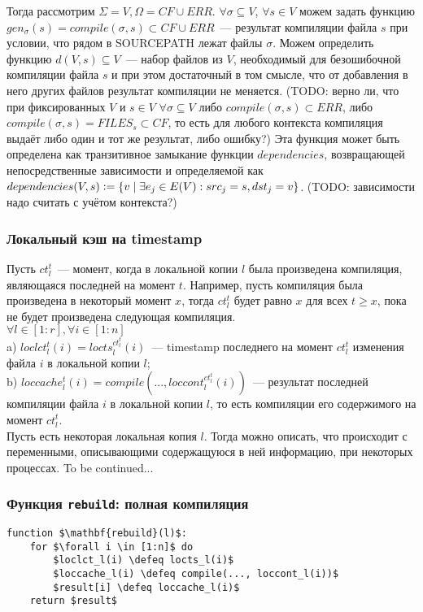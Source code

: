Тогда рассмотрим $\Sigma = V, \Omega = CF \cup ERR$. $\forall \sigma \subseteq V$, $\forall s \in V$ можем задать функцию $gen_\sigma(s) = \textit{compile}(\sigma, s) \subset CF \cup ERR$~--- результат компиляции файла $s$ при условии, что рядом в SOURCEPATH лежат файлы $\sigma$. Можем определить функцию $d(V,s) \subseteq V$~--- набор файлов из $V$, необходимый для безошибочной компиляции файла $s$ и при этом достаточный в том смысле, что от добавления в него других файлов результат компиляции не меняется. (TODO: верно ли, что при фиксированных $V$ и $s \in V$ $\forall \sigma \subseteq V$ либо $\textit{compile}(\sigma, s) \subset ERR$, либо $\textit{compile}(\sigma, s) = FILES_s \subset CF$, то есть для любого контекста компиляция выдаёт либо один и тот же результат, либо ошибку?) Эта функция может быть определена как транзитивное замыкание функции $dependencies$, возвращающей непосредственные зависимости и определяемой как $dependencies(V,s) \vcentcolon= \{v \mid \exists e_j \in E(V): src_j = s, dst_j = v\}$. (TODO: зависимости надо считать с учётом контекста?)

\subsubsection{Локальный кэш на timestamp}

Пусть $ct_l^t$~--- момент, когда в локальной копии $l$ была произведена компиляция, являющаяся последней на момент $t$. Например, пусть компиляция была произведена в некоторый момент $x$, тогда $ct_l^t$ будет равно $x$ для всех $t \geqslant x$, пока не будет произведена следующая компиляция.\\
$\forall l \in [1:r], \forall i \in [1:n]$\\
\indent a) $loclct_l^t(i) = locts_l^{ct_l^t}(i)$~--- timestamp последнего на момент $ct_l^t$ изменения файла $i$ в локальной копии $l$;\\
\indent b) $loccache_l^t(i) = compile(..., loccont_l^{ct_l^t}(i))$~--- результат последней компиляции файла $i$ в локальной копии $l$, то есть компиляции его содержимого на момент $ct_l^t$.\\

Пусть есть некоторая локальная копия $l$. Тогда можно описать, что происходит с переменными, описывающими содержащуюся в ней информацию, при некоторых процессах.
To be continued...\\

\subsubsection{Функция \texttt{rebuild}: полная компиляция}
\begin{lstlisting}
function $\mathbf{rebuild}(l)$:
	for $\forall i \in [1:n]$ do
		$loclct_l(i) \defeq locts_l(i)$
		$loccache_l(i) \defeq compile(..., loccont_l(i))$
		$result[i] \defeq loccache_l(i)$
	return $result$
\end{lstlisting}

